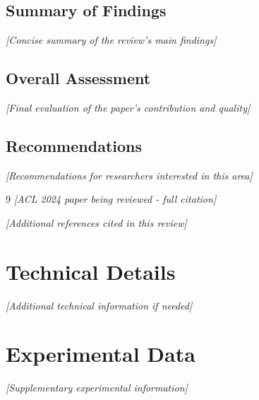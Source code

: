 \documentclass[12pt,a4paper]{article}
\begin{document}
\subsection{Summary of Findings}
\textit{[Concise summary of the review's main findings]}

\subsection{Overall Assessment}
\textit{[Final evaluation of the paper's contribution and quality]}

\subsection{Recommendations}
\textit{[Recommendations for researchers interested in this area]}

\begin{thebibliography}{9}
\textit{[ACL 2024 paper being reviewed - full citation]}

\textit{[Additional references cited in this review]}

\end{thebibliography}

\appendix

\section{Technical Details}
\textit{[Additional technical information if needed]}

\section{Experimental Data}
\textit{[Supplementary experimental information]}
\end{document}
